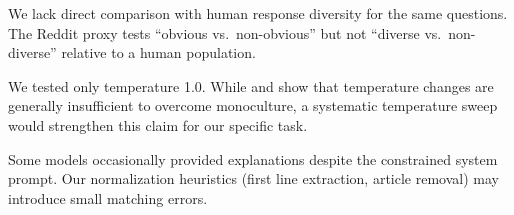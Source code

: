  We lack direct comparison with human response diversity for the same questions. The Reddit proxy tests ``obvious vs.\ non-obvious'' but not ``diverse vs.\ non-diverse'' relative to a human population.

 We tested only temperature 1.0. While \citet{wu2024monoculture} and \citet{correlated2025errors} show that temperature changes are generally insufficient to overcome monoculture, a systematic temperature sweep would strengthen this claim for our specific task.

 Some models occasionally provided explanations despite the constrained system prompt. Our normalization heuristics (first line extraction, article removal) may introduce small matching errors.

